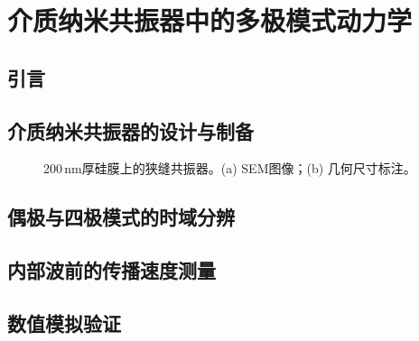 \chapter{介质纳米共振器中的多极模式动力学}
\label{chap:result2}

\section{引言}
\label{sec:r2-intro}


\section{介质纳米共振器的设计与制备}
\label{sec:r2-design}


\begin{figure}[htbp]
    \centering
    \caption{\label{fig:ch5-resonator} 200\,nm厚硅膜上的狭缝共振器。(a) SEM图像；(b) 几何尺寸标注。}
\end{figure}

\section{偶极与四极模式的时域分辨}
\label{sec:r2-multipolar}


\section{内部波前的传播速度测量}
\label{sec:r2-wavefront}


\section{数值模拟验证}
\label{sec:r2-simulation}


